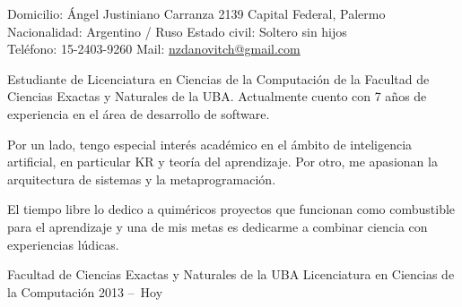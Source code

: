 \documentclass[10pt,a4paper]{article}
\begin{document}
\sloppy



\nobreakvspace{0.3em}

\noindent
Domicilio: Ángel Justiniano Carranza 2139 \sbull
Capital Federal, Palermo \\
Nacionalidad: Argentino / Ruso \sbull
Estado civil: Soltero sin hijos \\
Teléfono: 15-2403-9260 \sbull
Mail: \href{mailto:nzdanovitch.at.gmail.dot.com}{nzdanovitch\mbox{}@\mbox{}gmail.com}


\spacedhrule{1.2em}{-0.4em} %





\vspace{-1.3em}
\begin{multicols}{2}
\noindent

Estudiante de Licenciatura en Ciencias de la Computación de la Facultad de
Ciencias Exactas y Naturales de la UBA. Actualmente cuento con 7 años de
experiencia en el área de desarrollo de software.

Por un lado, tengo especial interés académico en el ámbito de inteligencia
artificial, en particular KR y teoría del aprendizaje. Por otro, me apasionan
la arquitectura de sistemas y la metaprogramación.

El tiempo libre lo dedico a quiméricos proyectos que funcionan como
combustible para el aprendizaje y una de mis metas es dedicarme a combinar
ciencia con experiencias lúdicas.


% 

\end{multicols}


\spacedhrule{0.3em}{-0.4em} %




\vspace{0.2em}
\headedsection
  { Facultad de Ciencias Exactas y Naturales de la UBA }
  { \textsc{} } {%
  \headedsubsection
    { Licenciatura en Ciencias de la Computación }
    { 2013 --\ Hoy \ }{}
}
\end{document}

